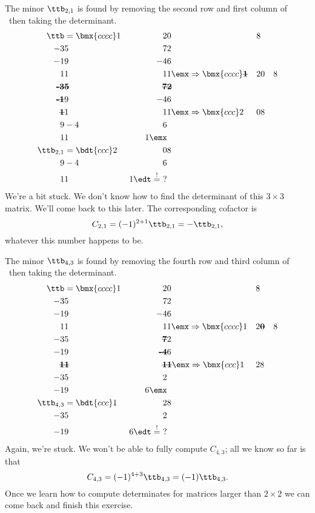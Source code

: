 {The minor $\ttb_{2,1}$ is found by removing the second row and first column of \ttb\ then taking the determinant.
\begin{align*}
\ttb &= \bmx{cccc}1&2&0&8\\-3&5&7&2\\-1&9&-4&6\\1&1&1&1\emx \Rightarrow \bmx{cccc}\textbf{\sout{1}}&2&0&8\\ \textbf{\sout{-3}}&\textbf{\sout{5}}&\textbf{\sout{7}}&\textbf{\sout{2}}\\ \textbf{\sout{-1}}&9&-4&6\\ \textbf{\sout{1}}&1&1&1\emx \Rightarrow \bmx{ccc}2&0&8\\9&-4&6\\1&1&1\emx\\
\ttb_{2,1} &= \bdt{ccc}2&0&8\\9&-4&6\\1&1&1\edt \stackrel{!}{=} \ ?
\end{align*}
We're a bit stuck. We don't know how to find the determinant of this $3\times 3$ matrix. We'll come back to this later. The corresponding cofactor is
\[
C_{2,1} = (-1)^{2+1}\ttb_{2,1} = -\ttb_{2,1},
\]
whatever this number happens to be.


The minor $\ttb_{4,3}$ is found by removing the fourth row and third column of \ttb\ then taking the determinant.
\begin{align*}
\ttb &= \bmx{cccc}1&2&0&8\\-3&5&7&2\\-1&9&-4&6\\1&1&1&1\emx \Rightarrow \bmx{cccc}1&2&\textbf{\sout{0}}&8\\-3&5&\textbf{\sout{7}}&2\\-1&9&\textbf{\sout{-4}}&6\\ \textbf{\sout{1}}&\textbf{\sout{1}}&\textbf{\sout{1}}&\textbf{\sout{1}}\emx \Rightarrow \bmx{ccc}1&2&8\\-3&5&2\\-1&9&6\emx\\
\ttb_{4,3} &= \bdt{ccc}1&2&8\\-3&5&2\\-1&9&6\edt \stackrel{!}{=}\ ?
\end{align*}
Again, we're stuck. We won't be able to fully compute $C_{4,3}$; all we know so far is that
\[
C_{4,3} = (-1)^{4+3}\ttb_{4,3} = (-1)\ttb_{4,3}.
\]
Once we learn how to compute determinates for matrices larger than $2\times 2$ we can come back and finish this exercise.}

